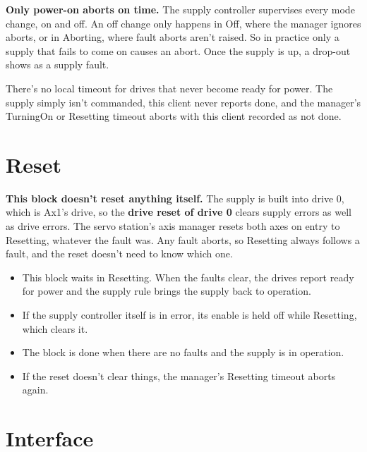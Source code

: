 \documentclass[11pt,a4paper]{report}
\begin{document}
\textbf{Only power-on aborts on time.} The supply controller supervises every mode change, on
and off. An off change only happens in Off, where the manager ignores aborts, or in Aborting,
where fault aborts aren't raised. So in practice only a supply that fails to come on causes an
abort. Once the supply is up, a drop-out shows as a supply fault.

There's no local timeout for drives that never become ready for power. The supply simply isn't
commanded, this client never reports done, and the manager's TurningOn or Resetting timeout
aborts with this client recorded as not done.

\section{Reset}

\textbf{This block doesn't reset anything itself.} The supply is built into drive 0, which is
Ax1's drive, so the \textbf{drive reset of drive 0} clears supply errors as well as drive
errors. The servo station's axis manager resets both axes on entry to Resetting, whatever the
fault was. Any fault aborts, so Resetting always follows a fault, and the reset doesn't need to
know which one.
\begin{itemize}
  \item This block waits in Resetting. When the faults clear, the drives report ready for power
        and the supply rule brings the supply back to operation.
  \item If the supply controller itself is in error, its enable is held off while Resetting,
        which clears it.
  \item The block is done when there are no faults and the supply is in operation.
  \item If the reset doesn't clear things, the manager's Resetting timeout aborts again.
\end{itemize}

\section{Interface}
\end{document}
